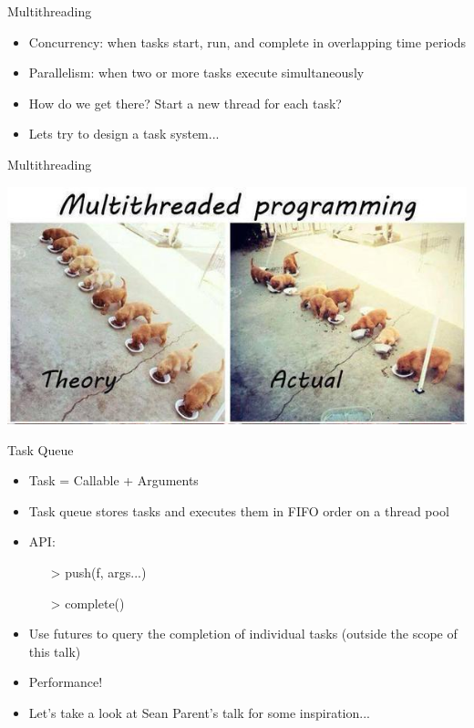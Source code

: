 \documentclass{beamer}
\begin{document}
\begin{frame}{Multithreading}
\begin{itemize}
\item Concurrency: when tasks start, run, and complete in overlapping time periods
\item Parallelism: when two or more tasks execute simultaneously
\item How do we get there? Start a new thread for each task?
\item Lets try to design a task system...
\end{itemize}
\end{frame}

\begin{frame}{Multithreading}
\begin{center}
\includegraphics[width=0.8\linewidth]{concurrency.jpeg}
\end{center}
\end{frame}

\begin{frame}{Task Queue}
\begin{itemize}
\item Task = Callable + Arguments
\item Task queue stores tasks and executes them in FIFO order on a thread pool
\item API:
\begin{itemize}
\item[>] push(f, args...)
\item[>] complete()
\end{itemize}
\item Use futures to query the completion of individual tasks (outside the scope of this talk)
\item Performance!
\item Let's take a look at Sean Parent's talk for some inspiration...
\end{itemize}
\end{frame}
\end{document}
